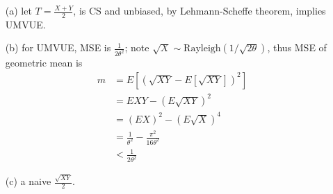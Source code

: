 \documentclass[paper=a4, fontsize=11pt]{scrartcl} %
\numberwithin{equation}{section} %
\numberwithin{figure}{section} %
\numberwithin{table}{section} %
\begin{document}
\begin{itemize}
\begin{itemize}
		\item[(a)] let $T=\frac{X+Y}{2}$, is CS and unbiased, by Lehmann-Scheffe theorem, implies UMVUE.
		\item[(b)] for UMVUE, MSE is $\frac{1}{2\theta^2}$; note $\sqrt{X}\sim \text{Rayleigh}(1/\sqrt{2\theta})$, thus MSE of geometric mean is
		\begin{align}
			m &= E[(\sqrt{XY}-E[\sqrt{XY}])^2]\\
				&= EXY - (E\sqrt{XY})^2\\
				&= (EX)^2 - (E\sqrt{X})^4\\
				&= \frac{1}{\theta^2} - \frac{\pi^2}{16\theta^2}\\
				&< \frac{1}{2\theta^2}
		\end{align}
		\item[(c)] a naive $\frac{\sqrt{XY}}{2}$.
	\end{itemize}
\end{itemize}
\end{document}
